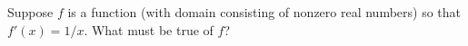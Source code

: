 \documentclass{ximera}
\begin{document}
\begin{problem}
  Suppose $f$ is a function (with domain consisting of nonzero real numbers) so that $f'(x) = 1/x$.  What must be true of $f$?
  \begin{multipleChoice}
  \end{multipleChoice}
\end{problem}
\end{document}
